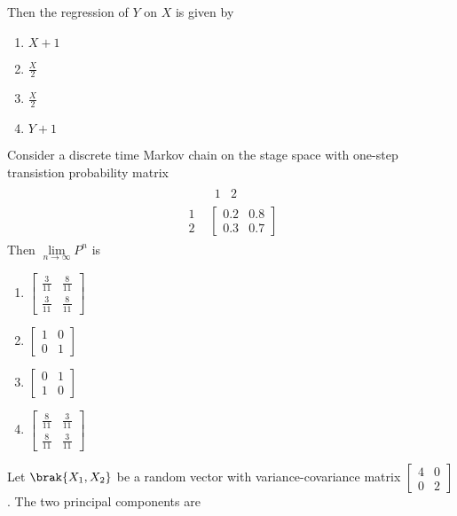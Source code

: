 		Then the regression of $Y$ on $X$ is given by
		\begin{enumerate}
			\item $X+1$
			\item $\frac{X}{2}$
			\item $\frac{X}{2}$
			\item $Y+1$
		\end{enumerate}
	\item Consider a discrete time Markov chain on the stage space  with one-step transistion probability matrix 	
		\begin{align*}
			\begin{array}{cc}
				& \begin{array}{cc} 1 & 2 \end{array}\\
					\begin{array}{c}
						1 \\ 
						2 
					\end{array} &
					\begin{bmatrix}
						0.2 & 0.8 \\
						0.3 & 0.7
					\end{bmatrix}
			\end{array}
		\end{align*}
		Then $\lim\limits_{n\to\infty}P^n$ is
		\begin{enumerate}
			\item $\begin{bmatrix} \frac{3}{11} & \frac{8}{11} \\ \frac{3}{11} & \frac{8}{11} \end{bmatrix}$
				\item $\begin{bmatrix} 1 & 0 \\ 0 & 1 \end{bmatrix}$
					\item $\begin{bmatrix} 0 & 1 \\ 1 & 0 \end{bmatrix}$
						\item $\begin{bmatrix} \frac{8}{11} & \frac{3}{11} \\ \frac{8}{11} & \frac{3}{11} \end{bmatrix}$
		\end{enumerate}
	\item Let $\brak{X_1, X_2}$ be a random vector with variance-covariance matrix $\begin{bmatrix} 4 & 0\\0 & 2\end{bmatrix}$. The two principal components are
